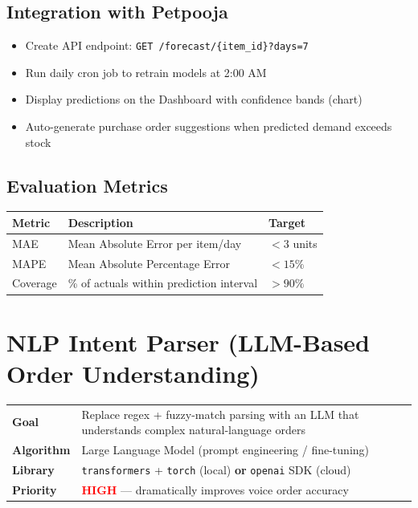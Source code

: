 \documentclass[12pt, a4paper]{article}
\begin{document}
\subsection{Integration with Petpooja}
\begin{itemize}[nosep]
    \item Create API endpoint: \texttt{GET /forecast/\{item\_id\}?days=7}
    \item Run daily cron job to retrain models at 2:00 AM
    \item Display predictions on the Dashboard with confidence bands (chart)
    \item Auto-generate purchase order suggestions when predicted demand exceeds stock
\end{itemize}


\subsection{Evaluation Metrics}
\begin{center}
\begin{tabular}{lll}
\toprule
\textbf{Metric} & \textbf{Description} & \textbf{Target} \\
\midrule
MAE   & Mean Absolute Error per item/day & $< 3$ units \\
MAPE  & Mean Absolute Percentage Error   & $< 15\%$ \\
Coverage & \% of actuals within prediction interval & $> 90\%$ \\
\bottomrule
\end{tabular}
\end{center}


\newpage
\section{NLP Intent Parser (LLM-Based Order Understanding)}

\begin{infobox}
\begin{tabularx}{\textwidth}{@{}lX@{}}
\textbf{Goal}       & Replace regex + fuzzy-match parsing with an LLM that understands complex natural-language orders \\
\textbf{Algorithm}  & Large Language Model (prompt engineering / fine-tuning) \\
\textbf{Library}    & \texttt{transformers} + \texttt{torch} (local) \textbf{or} \texttt{openai} SDK (cloud) \\
\textbf{Priority}   & \textcolor{red}{\textbf{HIGH}} --- dramatically improves voice order accuracy \\
\end{tabularx}
\end{infobox}
\end{document}
